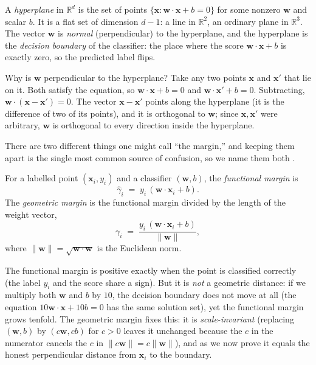 \begin{definition}[Hyperplane]
A \emph{hyperplane} in $\mathbb{R}^d$ is the set of points
$\{\mathbf{x} : \mathbf{w}\cdot\mathbf{x} + b = 0\}$ for some nonzero
$\mathbf{w}$ and scalar $b$. It is a flat set of dimension $d-1$: a line
in $\mathbb{R}^2$, an ordinary plane in $\mathbb{R}^3$. The vector
$\mathbf{w}$ is \emph{normal} (perpendicular) to the hyperplane, and the
hyperplane is the \emph{decision boundary} of the classifier: the place
where the score $\mathbf{w}\cdot\mathbf{x}+b$ is exactly zero, so the
predicted label flips.
\end{definition}

Why is $\mathbf{w}$ perpendicular to the hyperplane? Take any two points
$\mathbf{x}$ and $\mathbf{x}'$ that lie on it. Both satisfy the equation,
so $\mathbf{w}\cdot\mathbf{x}+b = 0$ and $\mathbf{w}\cdot\mathbf{x}'+b = 0$.
Subtracting, $\mathbf{w}\cdot(\mathbf{x}-\mathbf{x}') = 0$. The vector
$\mathbf{x}-\mathbf{x}'$ points along the hyperplane (it is the difference
of two of its points), and it is orthogonal to $\mathbf{w}$; since
$\mathbf{x},\mathbf{x}'$ were arbitrary, $\mathbf{w}$ is orthogonal to
every direction inside the hyperplane.

There are two different things one might call ``the margin,'' and keeping
them apart is the single most common source of confusion, so we name them
both \citep{burges1998}.

\begin{definition}
For a labelled point $(\mathbf{x}_i, y_i)$ and a classifier
$(\mathbf{w}, b)$, the \emph{functional margin} is
\[
  \hat{\gamma}_i \;=\; y_i\,(\mathbf{w}\cdot\mathbf{x}_i + b).
\]
The \emph{geometric margin} is the functional margin divided by the length
of the weight vector,
\[
  \gamma_i \;=\; \frac{y_i\,(\mathbf{w}\cdot\mathbf{x}_i + b)}{\|\mathbf{w}\|},
\]
where $\|\mathbf{w}\| = \sqrt{\mathbf{w}\cdot\mathbf{w}}$ is the Euclidean
norm.
\end{definition}

The functional margin is positive exactly when the point is classified
correctly (the label $y_i$ and the score share a sign). But it is
\emph{not} a geometric distance: if we multiply both $\mathbf{w}$ and $b$
by $10$, the decision boundary does not move at all (the equation
$10\mathbf{w}\cdot\mathbf{x}+10b=0$ has the same solution set), yet the
functional margin grows tenfold. The geometric margin fixes this: it is
\emph{scale-invariant} (replacing $(\mathbf{w},b)$ by $(c\mathbf{w},cb)$
for $c>0$ leaves it unchanged because the $c$ in the numerator cancels the
$c$ in $\|c\mathbf{w}\|=c\|\mathbf{w}\|$), and as we now prove it equals the
honest perpendicular distance from $\mathbf{x}_i$ to the boundary.

